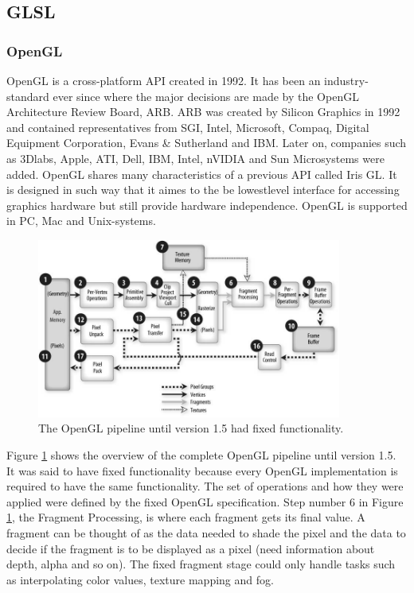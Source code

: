 \subsection{GLSL}

\subsubsection{OpenGL}

OpenGL is a cross-platform API created in 1992. It has been an industry-standard ever since where the major decisions are made by the OpenGL Architecture Review Board, ARB. ARB was created by Silicon Graphics in 1992 and contained representatives from SGI, Intel, Microsoft, Compaq, Digital Equipment Corporation, Evans \& Sutherland and IBM. Later on, companies such as 3Dlabs, Apple, ATI, Dell, IBM, Intel, nVIDIA and Sun Microsystems were added. OpenGL shares many characteristics of a previous API called Iris GL. It is designed in such way that it aimes to the be lowestlevel interface for accessing graphics hardware but still provide hardware independence. OpenGL is supported in PC, Mac and Unix-systems.

\begin{figure}[ht!]
\centering
\includegraphics[width=100mm]{img/fixed-gl.jpg}
\caption{The OpenGL pipeline until version 1.5 had fixed functionality.}
\label{glfixed}
\end{figure}

Figure \ref{glfixed} shows the overview of the complete OpenGL pipeline until version 1.5. It was said to have fixed functionality because every OpenGL implementation is required to have the same functionality. The set of operations and how they were applied were defined by the fixed OpenGL specification. Step number 6 in Figure \ref{glfixed}, the Fragment Processing, is where each fragment gets its final value. A fragment can be thought of as the data needed to shade the pixel and the data to decide if the fragment is to be displayed as a pixel (need information about depth, alpha and so on). The fixed fragment stage could only handle tasks such as interpolating color values, texture mapping and fog. 

